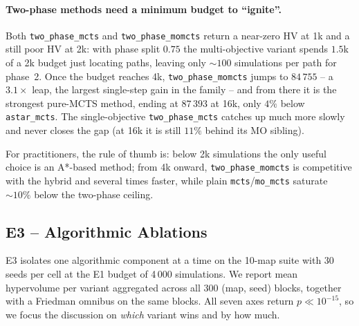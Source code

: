 \paragraph{Two-phase methods need a minimum budget to ``ignite''.} Both \texttt{two\_phase\_mcts} and \texttt{two\_phase\_momcts} return a near-zero HV at 1k and a still poor HV at 2k: with phase split $0.75$ the multi-objective variant spends $1.5$k of a 2k budget just locating paths, leaving only $\sim 100$ simulations per path for phase~2. Once the budget reaches 4k, \texttt{two\_phase\_momcts} jumps to $84\,755$ -- a $3.1\times$ leap, the largest single-step gain in the family -- and from there it is the strongest pure-MCTS method, ending at $87\,393$ at 16k, only $4\%$ below \texttt{astar\_mcts}. The single-objective \texttt{two\_phase\_mcts} catches up much more slowly and never closes the gap (at 16k it is still $11\%$ behind its MO sibling).

For practitioners, the rule of thumb is: below 2k simulations the only useful choice is an A*-based method; from 4k onward, \texttt{two\_phase\_momcts} is competitive with the hybrid and several times faster, while plain \texttt{mcts}/\texttt{mo\_mcts} saturate $\sim10\%$ below the two-phase ceiling.

\subsection{E3 -- Algorithmic Ablations}
\label{sec:e3}

E3 isolates one algorithmic component at a time on the 10-map suite with 30 seeds per cell at the E1 budget of 4\,000 simulations. We report mean hypervolume per variant aggregated across all 300 (map, seed) blocks, together with a Friedman omnibus on the same blocks. All seven axes return $p \ll 10^{-15}$, so we focus the discussion on \emph{which} variant wins and by how much.


